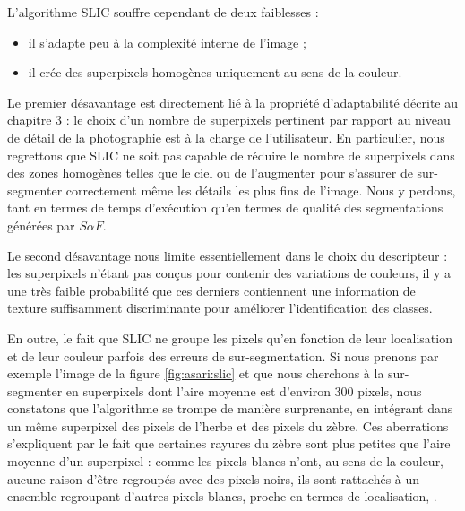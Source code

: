 L'algorithme SLIC souffre cependant de deux faiblesses :
\begin{itemize}
\item il s'adapte peu à la complexité interne de l'image ;
\item il crée des superpixels homogènes uniquement au sens de la couleur. 
\end{itemize}

Le premier désavantage est directement lié à la propriété d'adaptabilité décrite au chapitre 3 : le choix d'un nombre de superpixels pertinent par rapport au niveau de détail de la photographie est à la charge de l'utilisateur. En particulier, nous regrettons que SLIC ne soit pas capable de réduire le nombre de superpixels dans des zones homogènes telles que le ciel ou de l'augmenter pour s'assurer de sur-segmenter correctement même les détails les plus fins de l'image. Nous y perdons, tant en termes de temps d'exécution qu'en termes de qualité des segmentations générées par $S \alpha F$.

Le second désavantage nous limite essentiellement dans le choix du descripteur : les superpixels n'étant pas conçus pour contenir des variations de couleurs, il y a une très faible probabilité que ces derniers contiennent une information de texture suffisamment discriminante pour améliorer l'identification des classes.

En outre, le fait que SLIC ne groupe les pixels qu'en fonction de leur localisation et de leur couleur  parfois des erreurs de sur-segmentation. Si nous prenons par exemple l'image de la figure \ref{fig:asari:slic} et que nous cherchons à la sur-segmenter en superpixels dont l'aire moyenne est d'environ $300$ pixels, nous constatons que l'algorithme se trompe de manière surprenante, en intégrant dans un même superpixel des pixels de l'herbe et des pixels du zèbre. Ces aberrations s'expliquent par le fait que certaines rayures du zèbre sont plus petites que l'aire moyenne d'un superpixel : comme les pixels blancs n'ont, au sens de la couleur, aucune raison d'être regroupés avec des pixels noirs, ils sont rattachés à un ensemble regroupant d'autres pixels blancs, proche en termes de localisation, .

